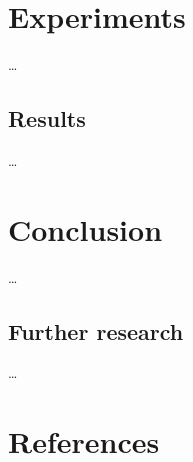 \documentclass{article}
\begin{document}
\section{Experiments}\label{sec:experiments}
\ldots

\subsection{Results}\label{sec:results}
\ldots

\section{Conclusion}\label{sec:conclusion}
\ldots

\subsection{Further research}\label{sec:furtherresearch}
\ldots

\section{References}\label{sec:references}
\printbibliography[heading=none]

\end{document}
